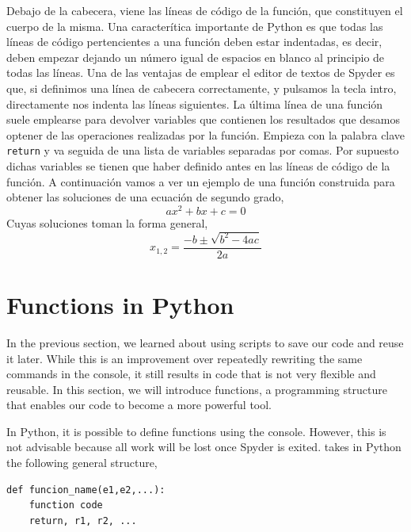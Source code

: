 \begin{paracol}{2}
Debajo de la cabecera, viene las líneas de código de la función, que constituyen el cuerpo de la misma. Una caracterítica importante de Python es que todas las líneas de código pertencientes a una función deben estar indentadas, es decir, deben empezar dejando un número igual de espacios en blanco al principio de todas las líneas. Una de las ventajas de emplear el editor de textos de Spyder es que, si definimos una línea de cabecera correctamente,  y pulsamos la tecla intro, directamente nos indenta las líneas siguientes. La última línea de una función suele emplearse para devolver variables que contienen los resultados que desamos optener de las operaciones realizadas por la función. Empieza con la palabra clave \texttt{return} y va seguida de una lista de variables separadas por comas. Por supuesto dichas variables se tienen que haber definido antes en las líneas de código de la función. A continuación vamos a ver un ejemplo de una función construida para obtener las soluciones de una ecuación de segundo grado,
\begin{equation*}
    ax^2+bx+c = 0
\end{equation*}
Cuyas soluciones toman la forma general,
\begin{equation*}
    x_{1,2} = \frac{-b\pm \sqrt{b^2-4ac}}{2a}
\end{equation*}
\switchcolumn
\section[Functions in Python]{Functions in Python} 
In the previous section, we learned about using scripts to save our code and reuse it later. While this is an improvement over repeatedly rewriting the same commands in the console, it still results in code that is not very flexible and reusable. In this section, we will introduce functions, a programming structure that enables our code to become a more powerful tool.

In Python, it is possible to define functions using the console. However, this is not advisable because all work will be lost once Spyder is exited. takes in Python the following general structure,

\begin{verbatim}
def funcion_name(e1,e2,...):
    function code
    return, r1, r2, ...
\end{verbatim}


\end{paracol}

